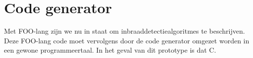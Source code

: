 
\section{Code generator}
\label{section:devel-codegen}

Met FOO-lang zijn we nu in staat om inbraaddetectiealgoritmes te beschrijven.
Deze FOO-lang code moet vervolgens door de code generator omgezet worden in een
gewone programmeertaal. In het geval van dit prototype is dat C.







